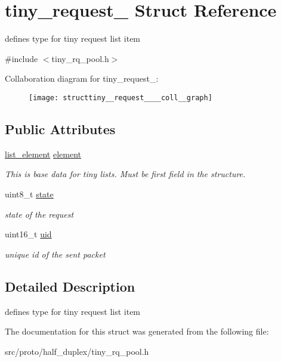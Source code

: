 \hypertarget{structtiny__request__}{}\section{tiny\+\_\+request\+\_\+ Struct Reference}
\label{structtiny__request__}


defines type for tiny request list item  




{\ttfamily \#include $<$tiny\+\_\+rq\+\_\+pool.\+h$>$}



Collaboration diagram for tiny\+\_\+request\+\_\+\+:\nopagebreak
\begin{figure}[H]
\begin{center}
\leavevmode
\texttt{[image: structtiny\_\_request\_\_\_\_coll\_\_graph]}
\end{center}
\end{figure}
\subsection*{Public Attributes}
\begin{DoxyCompactItemize}
\item 
\mbox{\label{structtiny__request___a02c8fb6d26d0cfb0264423a1cb643159}} 
\hyperlink{structlist__element__}{list\+\_\+element} \hyperlink{structtiny__request___a02c8fb6d26d0cfb0264423a1cb643159}{element}
\begin{DoxyCompactList}\small\item\em This is base data for tiny lists. Must be first field in the structure. \end{DoxyCompactList}\item 
\mbox{\label{structtiny__request___a019207b55569a48a82a2922dd3cc7eb2}} 
uint8\+\_\+t \hyperlink{structtiny__request___a019207b55569a48a82a2922dd3cc7eb2}{state}
\begin{DoxyCompactList}\small\item\em state of the request \end{DoxyCompactList}\item 
\mbox{\label{structtiny__request___aefa85d07e09d6772963532b6cf1ed125}} 
uint16\+\_\+t \hyperlink{structtiny__request___aefa85d07e09d6772963532b6cf1ed125}{uid}
\begin{DoxyCompactList}\small\item\em unique id of the sent packet \end{DoxyCompactList}\end{DoxyCompactItemize}


\subsection{Detailed Description}
defines type for tiny request list item 

The documentation for this struct was generated from the following file\+:\begin{DoxyCompactItemize}
\item 
src/proto/half\+\_\+duplex/tiny\+\_\+rq\+\_\+pool.\+h\end{DoxyCompactItemize}
